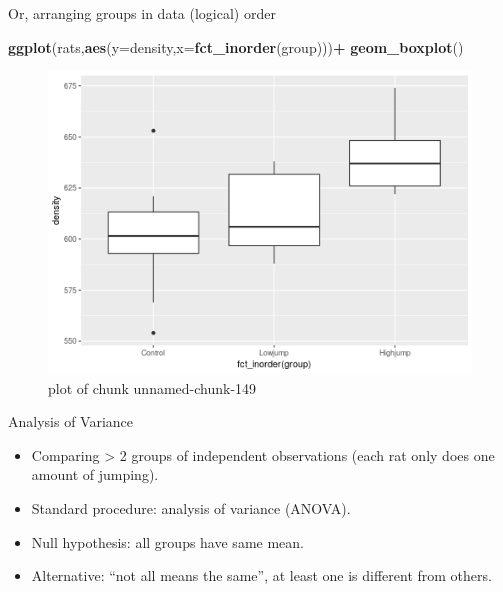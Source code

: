 \documentclass[ignorenonframetext,]{beamer}
\newenvironment{Shaded}{\begin{snugshade}}{\end{snugshade}}
\newcommand{\DataTypeTok}[1]{\textcolor[rgb]{0.13,0.29,0.53}{#1}}
\newcommand{\KeywordTok}[1]{\textcolor[rgb]{0.13,0.29,0.53}{\textbf{#1}}}
\newcommand{\NormalTok}[1]{#1}
\newcommand{\OperatorTok}[1]{\textcolor[rgb]{0.81,0.36,0.00}{\textbf{#1}}}
\providecommand{\tightlist}{%
  \setlength{\itemsep}{0pt}\setlength{\parskip}{0pt}}
\begin{document}
\begin{frame}[fragile]{Or, arranging groups in data (logical) order}
\protect\hypertarget{or-arranging-groups-in-data-logical-order}{}

\begin{Shaded}
\begin{Highlighting}[]
\KeywordTok{ggplot}\NormalTok{(rats,}\KeywordTok{aes}\NormalTok{(}\DataTypeTok{y=}\NormalTok{density,}\DataTypeTok{x=}\KeywordTok{fct_inorder}\NormalTok{(group)))}\OperatorTok{+}
\KeywordTok{geom_boxplot}\NormalTok{()}
\end{Highlighting}
\end{Shaded}

\begin{figure}
\centering
\includegraphics{figure/unnamed-chunk-149-1.png}
\caption{plot of chunk unnamed-chunk-149}
\end{figure}

\end{frame}

\begin{frame}{Analysis of Variance}
\protect\hypertarget{analysis-of-variance}{}

\begin{itemize}
\tightlist
\item
  Comparing \textgreater{} 2 groups of independent observations (each
  rat only does one amount of jumping).
\item
  Standard procedure: analysis of variance (ANOVA).
\item
  Null hypothesis: all groups have same mean.
\item
  Alternative: ``not all means the same'', at least one is different
  from others.
\end{itemize}

\end{frame}
\end{document}
